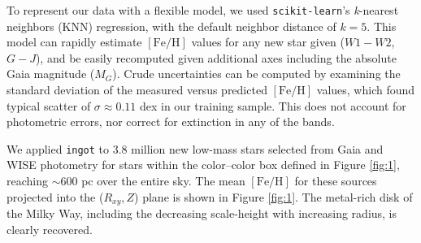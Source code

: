 \documentclass[modern]{rnaastex}
\newcommand{\ingot}{{\tt ingot}\xspace} %
\newcommand{\feh}{$[\mathrm{Fe}/\mathrm{H}]$\xspace}
\begin{document}
To represent our data with a flexible model, we used {\tt scikit-learn}'s {\it k}-nearest neighbors (KNN) regression, with the default neighbor distance of $k=5$. This model can rapidly estimate \feh values for any new star given ($W1-W2$, $G-J$), and be easily recomputed given additional axes including the absolute Gaia magnitude ($M_G$). Crude uncertainties can be computed by examining the standard deviation of the measured versus predicted \feh values, which found typical scatter of $\sigma\approx0.11$ dex in our training sample. This does not account for photometric errors, nor correct for extinction in any of the bands.


We applied \ingot to 3.8 million new low-mass stars selected from Gaia and WISE photometry for stars within the color--color box defined in Figure \ref{fig:1}, reaching $\sim$600 pc over the entire sky. The mean \feh for these sources projected into the ($R_{xy}, Z$) plane is shown in Figure \ref{fig:1}. The metal-rich disk of the Milky Way, including the decreasing scale-height with increasing radius, is clearly recovered.







\end{document}
